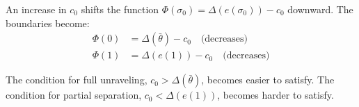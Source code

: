 An increase in $c_0$ shifts the function $\Phi(\sigma_0) = \Delta(e(\sigma_0)) - c_0$ downward. The boundaries become:
\begin{equation}
    \begin{split}
        \Phi(0) &= \Delta(\bar{\theta}) - c_0 \quad \text{(decreases)} \\
        \Phi(1) &= \Delta(e(1)) - c_0 \quad \text{(decreases)}
    \end{split}
\end{equation}

The condition for full unraveling, $c_0 > \Delta(\bar{\theta})$, becomes easier to satisfy. The condition for partial separation, $c_0 < \Delta(e(1))$, becomes harder to satisfy.
